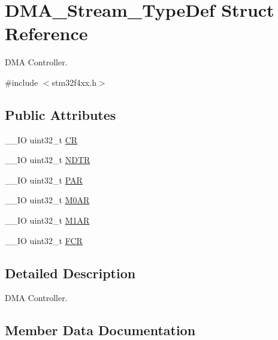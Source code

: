 \hypertarget{struct_d_m_a___stream___type_def}{}\section{D\+M\+A\+\_\+\+Stream\+\_\+\+Type\+Def Struct Reference}
\label{struct_d_m_a___stream___type_def}


D\+M\+A Controller.  




{\ttfamily \#include $<$stm32f4xx.\+h$>$}

\subsection*{Public Attributes}
\begin{DoxyCompactItemize}
\item 
\+\_\+\+\_\+\+I\+O uint32\+\_\+t \hyperlink{struct_d_m_a___stream___type_def_af893adc5e821b15d813237b2bfe4378b}{C\+R}
\item 
\+\_\+\+\_\+\+I\+O uint32\+\_\+t \hyperlink{struct_d_m_a___stream___type_def_a2cc2a52628182f9e79ab1e49bb78a1eb}{N\+D\+T\+R}
\item 
\+\_\+\+\_\+\+I\+O uint32\+\_\+t \hyperlink{struct_d_m_a___stream___type_def_adbeac1d47cb85ab52dac71d520273947}{P\+A\+R}
\item 
\+\_\+\+\_\+\+I\+O uint32\+\_\+t \hyperlink{struct_d_m_a___stream___type_def_a965da718db7d0303bff185d367d96fd6}{M0\+A\+R}
\item 
\+\_\+\+\_\+\+I\+O uint32\+\_\+t \hyperlink{struct_d_m_a___stream___type_def_a142ca5a1145ba9cf4cfa557655af1c13}{M1\+A\+R}
\item 
\+\_\+\+\_\+\+I\+O uint32\+\_\+t \hyperlink{struct_d_m_a___stream___type_def_aad3d78ab35e7af48951be5be53392f9f}{F\+C\+R}
\end{DoxyCompactItemize}


\subsection{Detailed Description}
D\+M\+A Controller. 

\subsection{Member Data Documentation}
\hypertarget{struct_d_m_a___stream___type_def_af893adc5e821b15d813237b2bfe4378b}{}
